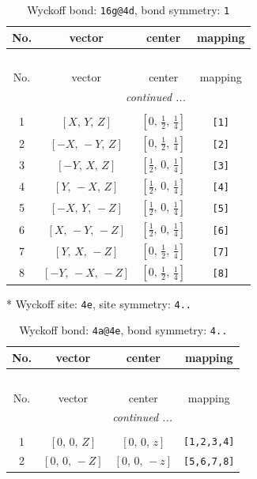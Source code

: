 \documentclass[fleqn,8pt]{jsarticle}
\begin{document}
\begin{longtable}{cccc}
\caption{Wyckoff bond: {\tt 16g@4d}, bond symmetry: {\tt 1}}
 \\
 \hline \hline
No. & vector & center & mapping \\ \hline \endfirsthead

\multicolumn{3}{l}{\tablename\ \thetable{}} \\
 \hline \hline
No. & vector & center & mapping \\ \hline \endhead

 \hline \hline
\multicolumn{3}{r}{\footnotesize\it continued ...} \\ \endfoot

 \hline \hline
\multicolumn{3}{r}{} \\ \endlastfoot

1 & $\left[ X,\, Y,\, Z \right]$ & $\left[ 0,\, \frac{1}{2},\, \frac{1}{4} \right]$ & {\tt [1]} \\ \hline
2 & $\left[ - X,\, - Y,\, Z \right]$ & $\left[ 0,\, \frac{1}{2},\, \frac{1}{4} \right]$ & {\tt [2]} \\ \hline
3 & $\left[ - Y,\, X,\, Z \right]$ & $\left[ \frac{1}{2},\, 0,\, \frac{1}{4} \right]$ & {\tt [3]} \\ \hline
4 & $\left[ Y,\, - X,\, Z \right]$ & $\left[ \frac{1}{2},\, 0,\, \frac{1}{4} \right]$ & {\tt [4]} \\ \hline
5 & $\left[ - X,\, Y,\, - Z \right]$ & $\left[ \frac{1}{2},\, 0,\, \frac{1}{4} \right]$ & {\tt [5]} \\ \hline
6 & $\left[ X,\, - Y,\, - Z \right]$ & $\left[ \frac{1}{2},\, 0,\, \frac{1}{4} \right]$ & {\tt [6]} \\ \hline
7 & $\left[ Y,\, X,\, - Z \right]$ & $\left[ 0,\, \frac{1}{2},\, \frac{1}{4} \right]$ & {\tt [7]} \\ \hline
8 & $\left[ - Y,\, - X,\, - Z \right]$ & $\left[ 0,\, \frac{1}{2},\, \frac{1}{4} \right]$ & {\tt [8]} \\
\end{longtable}
* Wyckoff site: {\tt 4e}, site symmetry: {\tt 4..}
\renewcommand{\arraystretch}{1.2}
\begin{longtable}{cccc}
\caption{Wyckoff bond: {\tt 4a@4e}, bond symmetry: {\tt 4..}}
 \\
 \hline \hline
No. & vector & center & mapping \\ \hline \endfirsthead

\multicolumn{3}{l}{\tablename\ \thetable{}} \\
 \hline \hline
No. & vector & center & mapping \\ \hline \endhead

 \hline \hline
\multicolumn{3}{r}{\footnotesize\it continued ...} \\ \endfoot

 \hline \hline
\multicolumn{3}{r}{} \\ \endlastfoot

1 & $\left[ 0,\, 0,\, Z \right]$ & $\left[ 0,\, 0,\, z \right]$ & {\tt [1,2,3,4]} \\ \hline
2 & $\left[ 0,\, 0,\, - Z \right]$ & $\left[ 0,\, 0,\, - z \right]$ & {\tt [5,6,7,8]} \\
\end{longtable}
\end{document}

